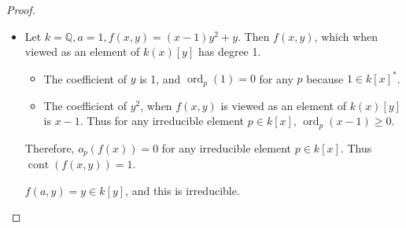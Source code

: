 \documentclass[12pt, psamsfonts]{amsart}
\theoremstyle{definition}
\theoremstyle{remark}
\DeclareMathOperator{\ord}{ord}
\DeclareMathOperator{\cont}{cont}
\numberwithin{equation}{section}
\begin{document}
\begin{proof}
\begin{itemize}
    \item
      Let $k = \mathbb{Q}, a = 1, f(x, y) = (x - 1)y^2 + y$.
      Then $f(x, y)$, which when viewed as an element of $k(x)[y]$ has degree 1.
      \begin{itemize}
        \item
          The coefficient of $y$ is 1, and $\ord_p(1) = 0$ for any $p$ because $1 \in k[x]^*$.
        \item
          The coefficient of $y^2$, when $f(x, y)$ is viewed as an element of $k(x)[y]$ is $x - 1$.
          Thus for any irreducible element $p \in k[x]$, $\ord_p(x - 1) \geq 0$.
      \end{itemize}
      Therefore, $o_p(f(x)) = 0$ for any irreducible element $p \in k[x]$.
      Thus $\cont(f(x, y)) = 1$.
      
      $f(a, y) = y \in k[y]$, and this is irreducible.
  \end{itemize}
\end{proof}
\end{document}
